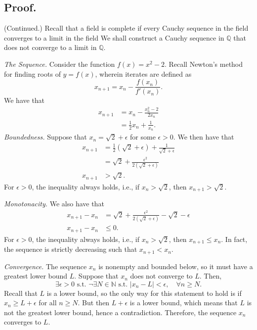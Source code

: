 \documentclass[titlepage]{article}
\begin{document}
\subsection{Proof.} (Continued.) Recall that a field is complete if every Cauchy sequence in the field converges to a limit in the field We shall construct a Cauchy sequence in $\mathbb{Q}$ that does not converge to a limit in $\mathbb{Q}$. 

\textit{The Sequence.} Consider the function $f(x) = x^{2} - 2$. Recall Newton's method for finding roots of $y = f(x)$, wherein iterates are defined as 
$$x_{n+1} = x_{n} - \frac{f(x_{n})}{f'(x_{n})}.$$
We have that 
\begin{align*}
    x_{n+1} &= x_{n} - \frac{x_{n}^{2} - 2}{2x_{n}} \\
            &= \frac{1}{2}x_{n} + \frac{1}{x_{n}}.
\end{align*}
\textit{Boundedness.} Suppose that $x_{n} = \sqrt{2} + \epsilon$ for some $\epsilon > 0$. We then have that 
\begin{align*}
    x_{n+1} &= \frac{1}{2}(\sqrt{2} + \epsilon) + \frac{1}{\sqrt{2} + \epsilon} \\
            &= \sqrt{2} + \frac{\epsilon^{2}}{2(\sqrt{2} + \epsilon)} \\
    x_{n+1} &> \sqrt{2}.
\end{align*}
For $\epsilon > 0$,  the inequality always holds, i.e., if $x_{n} > \sqrt{2}$, then $x_{n+1} > \sqrt{2}$. 

\textit{Monotonacity.} We also have that 
\begin{align*}
    x_{n+1} - x_{n} &= \sqrt{2} +  \frac{\epsilon^{2}}{2(\sqrt{2} + \epsilon)} - \sqrt{2} - \epsilon \\
    x_{n+1} - x_{n} &\leq 0.
\end{align*}
For $\epsilon > 0$, the inequality always holds, i.e., if $x_{n} > \sqrt{2}$, then $x_{n+1} \leq x_{n}$. In fact, the sequence is strictly decreasing such that $x_{n+1} < x_{n}$.

\textit{Convergence.} The sequence $x_{n}$ is nonempty and bounded below, so it must have a greatest lower bound $L$. Suppose that $x_{n}$ does not converge to $L$. Then, 
$$\exists\epsilon>0 \text{ s.t. } \neg\exists N \in \mathbb{N} \text{ s.t. } |x_{n}-L|<\epsilon, \quad \forall n \geq N.$$
Recall that $L$ is a lower bound, so the only way for this statement to hold is if 
$x_{n} \geq L + \epsilon$ for all $n \geq N$. But then $L + \epsilon$ is a lower bound, which means that $L$ is not the 
greatest lower bound, hence a contradiction. Therefore, the sequence $x_{n}$ converges to $L$. 
\end{document}
